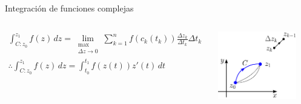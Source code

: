 \documentclass[9pt, aspectratio=169]{beamer}
\begin{document}
\begin{frame}{Integración de funciones complejas}
\begin{columns}[t]
   \begin{multline*} \int_{C: z_0}^{z_1} f(z) \, dz = \lim_{\substack{\max \\ \Delta z \rightarrow 0}} \sum_{k=1}^n f(c_k(t_k)) \frac{\Delta z_k}{\Delta t_k} \Delta t_k \\
       \therefore \int_{C: z_0}^{z_1} f(z) \, dz = \int_{t_0}^{t_1} f(z(t)) z'(t) \, dt
   \end{multline*}

  \vspace{2em}
  \begin{center}
      \includegraphics[width=0.85\textwidth]{figs/fig-02.pdf}
  \end{center}

\end{columns}


\end{frame}
\end{document}
